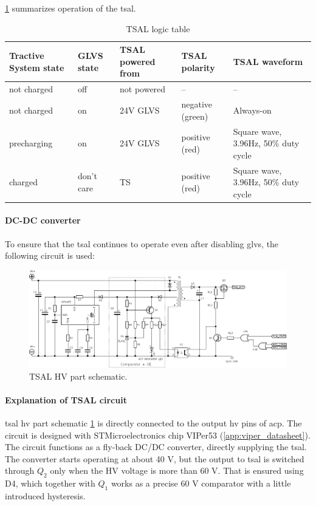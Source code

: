\ref{fig:TSAL-logic-table} summarizes operation of the \gls{tsal}.

\begin{table}[H]
	\centering
	\caption{TSAL logic table}
	\begin{tabularx}{\textwidth}{|X|X|X|X|X|}
		\hline
		\textbf{Tractive System state} & \textbf{GLVS state} & \textbf{TSAL powered from} & \textbf{TSAL polarity} & \textbf{TSAL waveform} \\
		\hline
		not charged & off & not powered & -- & -- \\
		\hline
		not charged & on & 24V GLVS & negative (green) & Always-on \\
		\hline
		precharging & on & 24V GLVS & positive (red) & Square wave, 3.96Hz, 50\% duty cycle \\
		\hline
		charged & don't care & TS & positive (red) & Square wave, 3.96Hz, 50\% duty cycle \\
		\hline
	\end{tabularx}%
	\label{fig:TSAL-logic-table}
\end{table}%

\paragraph{DC-DC converter}

To ensure that the \gls{tsal} continues to operate even after disabling \gls{glvs}, the following circuit is used:

\begin{figure}[H]
	\centering
	\includegraphics[width=\textwidth]{./img/ECUA_TSAL_POWER.pdf}
	\caption{TSAL HV part schematic.}
	\label{fig:TSAL-HV}
\end{figure}

\paragraph{Explanation of TSAL circuit}
\Gls{tsal} \gls{hv} part schematic \ref{fig:TSAL-HV} is directly connected to the output \gls{hv} pins of \gls{acp}. The circuit is designed with STMicroelectronics chip VIPer53 (\ref{app:viper_datasheet}). The circuit functions as a fly-back DC/DC converter, directly supplying the \gls{tsal}. The converter starts operating at about 40 V, but the output to \gls{tsal} is switched through $Q_2$ only when the HV voltage is more than 60 V. That is ensured using D4, which together with $Q_1$ works as a precise 60 V comparator with a little introduced hysteresis.

